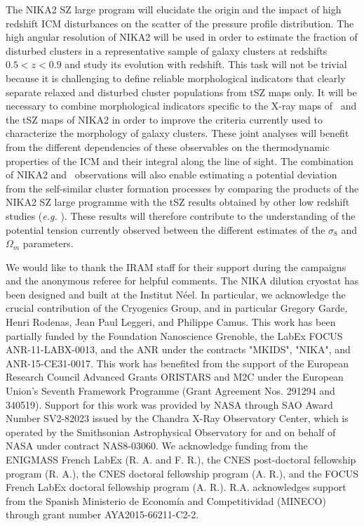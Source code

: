 \documentclass[twocolumn,traditabstract]{aa}
\begin{document}
The NIKA2 SZ large program will elucidate the origin and the impact of high redshift ICM disturbances on the scatter of the pressure profile distribution. The high angular resolution of NIKA2 will be used in order to estimate the fraction of disturbed clusters in a representative sample of galaxy clusters at redshifts $0.5<z<0.9$ and study its evolution with redshift. This task will not be trivial because it is challenging to define reliable morphological indicators that clearly separate relaxed and disturbed cluster populations from tSZ maps only. It will be necessary to combine morphological indicators specific to the X-ray maps of \xmm\ and the tSZ maps of NIKA2 in order to improve the criteria currently used to characterize the morphology of galaxy clusters. These joint analyses will benefit from the different dependencies of these observables on the thermodynamic properties of the ICM and their integral along the line of sight. The combination of NIKA2 and \xmm\ observations will also enable estimating a potential deviation from the self-similar cluster formation processes by comparing the products of the NIKA2 SZ large programme with the tSZ results obtained by other low redshift studies (\emph{e.g.} \citep{pla13}). These results will therefore contribute to the understanding of the potential tension currently observed between the different estimates of the $\sigma_8$ and $\Omega_m$ parameters.

\begin{acknowledgements}
We would like to thank the IRAM staff for their support during the campaigns and the anonymous referee for helpful comments. 
The NIKA dilution cryostat has been designed and built at the Institut N\'eel. 
In particular, we acknowledge the crucial contribution of the Cryogenics Group, and 
in particular Gregory Garde, Henri Rodenas, Jean Paul Leggeri, and Philippe Camus. 
This work has been partially funded by the Foundation Nanoscience Grenoble, the LabEx FOCUS ANR-11-LABX-0013, and 
the ANR under the contracts "MKIDS", "NIKA", and ANR-15-CE31-0017. This work has benefited from the support of the European Research Council Advanced Grants ORISTARS and M2C under the European Union’s Seventh Framework Programme (Grant Agreement Nos. 291294 and 340519). Support for this work was provided by NASA through SAO Award Number SV2-82023 issued by the Chandra X-Ray Observatory Center, which is operated by the Smithsonian Astrophysical Observatory for and on behalf of NASA under contract NAS8-03060. We acknowledge funding from the ENIGMASS French LabEx (R. A. and F. R.), 
the CNES post-doctoral fellowship program (R. A.),  the CNES doctoral fellowship program (A. R.), and 
the FOCUS French LabEx doctoral fellowship program (A. R.). R.A. acknowledges support from the Spanish Ministerio de Econom\'ia and Competitividad (MINECO) through grant number AYA2015-66211-C2-2.
\end{acknowledgements}
\end{document}
